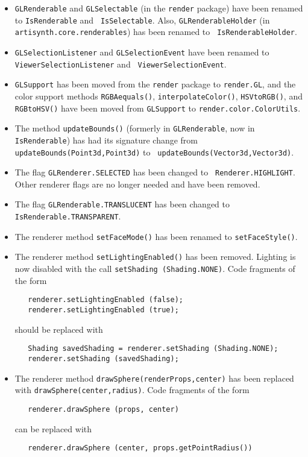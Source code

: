\documentclass{article}
\begin{document}
\begin{itemize}

\item {\tt GLRenderable} and {\tt GLSelectable} (in the {\tt render} package)
have been renamed to {\tt IsRenderable} and {\tt
IsSelectable}.  Also, {\tt GLRenderableHolder} (in {\tt
artisynth.core.renderables}) has been renamed to {\tt
IsRenderableHolder}.

\item {\tt GLSelectionListener} and {\tt GLSelectionEvent} have been
renamed to {\tt ViewerSelectionListener} and {\tt
ViewerSelectionEvent}.

\item {\tt GLSupport} has been moved from the {\tt render} package to
{\tt render.GL}, and the color support methods {\tt RGBAequals()},
{\tt interpolateColor()}, {\tt HSVtoRGB()}, and {\tt RGBtoHSV()} have
been moved from {\tt GLSupport} to {\tt render.color.ColorUtils}.

\item The method {\tt updateBounds()} (formerly in {\tt GLRenderable},
now in {\tt IsRenderable}) has had its signature change from {\tt
updateBounds(Point3d,Point3d)} to {\tt
updateBounds(Vector3d,Vector3d)}.

\item The flag {\tt GLRenderer.SELECTED} has been changed to {\tt
Renderer.HIGHLIGHT}. Other renderer flags are no longer needed and
have been removed.

\item The flag {\tt GLRenderable.TRANSLUCENT} has been changed to {\tt
IsRenderable.TRANSPARENT}.

\item The renderer method {\tt setFaceMode()} has been renamed to
{\tt setFaceStyle()}.

\item The renderer method {\tt setLightingEnabled()} has been
removed. Lighting is now disabled with the call {\tt setShading
(Shading.NONE)}. Code fragments of the form
\begin{verbatim}
   renderer.setLightingEnabled (false);
   renderer.setLightingEnabled (true);
\end{verbatim}
should be replaced with
\begin{verbatim}
   Shading savedShading = renderer.setShading (Shading.NONE);
   renderer.setShading (savedShading);
\end{verbatim}

\item The renderer method 
{\tt drawSphere(renderProps,center)}
has been replaced with
{\tt drawSphere(center,radius)}.
Code fragments of the form
\begin{verbatim}
   renderer.drawSphere (props, center)
\end{verbatim}
can be replaced with
\begin{verbatim}
   renderer.drawSphere (center, props.getPointRadius())
\end{verbatim}


\end{itemize}
\end{document}
